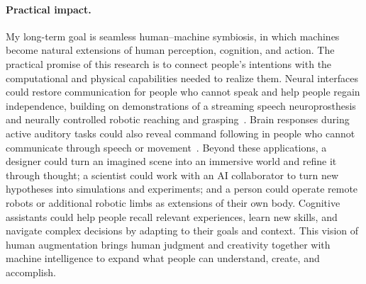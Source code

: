 \paragraph{Practical impact.}
My long-term goal is seamless human--machine symbiosis, in which machines become natural extensions of human perception, cognition, and action. The practical promise of this research is to connect people's intentions with the computational and physical capabilities needed to realize them. Neural interfaces could restore communication for people who cannot speak and help people regain independence, building on demonstrations of a streaming speech neuroprosthesis~\citep{littlejohn2025streaming} and neurally controlled robotic reaching and grasping~\citep{hochberg2012reach}. Brain responses during active auditory tasks could also reveal command following in people who cannot communicate through speech or movement~\citep{lule2013probing,chennu2013dissociable}. Beyond these applications, a designer could turn an imagined scene into an immersive world and refine it through thought; a scientist could work with an AI collaborator to turn new hypotheses into simulations and experiments; and a person could operate remote robots or additional robotic limbs as extensions of their own body. Cognitive assistants could help people recall relevant experiences, learn new skills, and navigate complex decisions by adapting to their goals and context. This vision of human augmentation brings human judgment and creativity together with machine intelligence to expand what people can understand, create, and accomplish.





